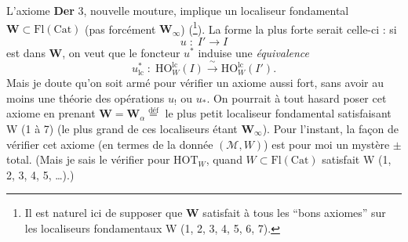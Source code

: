 L'axiome \textbf{Der} 3, nouvelle mouture, implique un localiseur fondamental $\mathbf{W} \subset \mathrm{Fl}(\mathrm{Cat})$ (pas forcément $\mathbf{W}_{\infty}$) (\footnote[33]{Il est naturel ici de supposer que $\mathbf{W}$ satisfait à tous les ``bons axiomes'' sur les localiseurs fondamentaux W (1, 2, 3, 4, 5, 6, 7).}). La forme la plus forte serait celle-ci : si
\[ u \;:\; I' \longrightarrow I \]
est dans $\mathbf{W}$, on veut que le foncteur $u^{*}$ induise une \textit{équivalence}
\[ u_{\mathrm{lc}}^{*} \;:\; \mathrm{HO}_{W}^{\mathrm{lc}}(I) \xrightarrow{\;\sim\;} \mathrm{HO}_{W}^{\mathrm{lc}}(I'). \]
Mais je doute qu'on soit armé pour vérifier un axiome aussi fort, sans avoir au moins une théorie des opérations $u_{!}$ ou $u_{*}$. On pourrait à tout hasard poser cet axiome en prenant $\mathbf{W} = \mathbf{W}_{\alpha} \overset{\text{déf}}{=}$ le plus petit localiseur fondamental satisfaisant W (1 à 7) (le plus grand de
ces localiseurs étant $\mathbf{W}_{\infty}$). Pour l'instant, la façon de vérifier cet axiome (en termes de la donnée $(\mathcal{M},W)$) est pour moi un mystère $\pm$ total. (Mais je sais le vérifier pour $\mathrm{HOT}_{W}$, quand $W \subset \mathrm{Fl}(\mathrm{Cat})$ satisfait W (1, 2, 3, 4, 5, \dots).)

